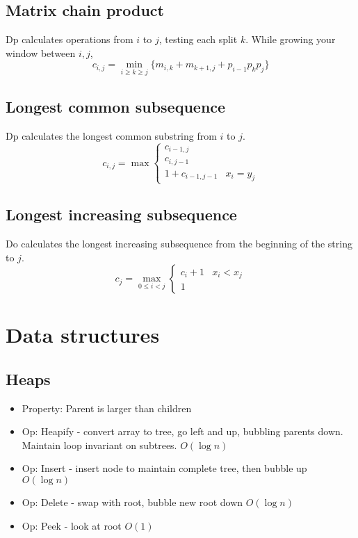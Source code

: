\subsection{Matrix chain product}
Dp calculates operations from $i$ to $j$, testing each split $k$. While growing your window between $i,j$,
$$c_{i,j} = \min_{i\geq k\geq j} \{m_{i,k} + m_{k+1,j} + p_{i-1} p_{k} p_{j}\}$$

\subsection{Longest common subsequence}
Dp calculates the longest common substring from $i$ to $j$.
$$c_{i,j} = \max\begin{cases}
c_{i-1, j}\\
c_{i, j-1}\\
1+c_{i-1, j-1} & x_i=y_j
\end{cases}$$

\subsection{Longest increasing subsequence}
Do calculates the longest increasing subsequence from the beginning of the string to $j$.
$$c_{j} = \max_{0\leq i < j}\begin{cases}
c_{i} + 1 & x_i < x_j\\
1
\end{cases}$$

\section{Data structures}
\subsection{Heaps}
\begin{itemize}
    \item Property: Parent is larger than children
    \item Op: Heapify - convert array to tree, go left and up, bubbling parents down. Maintain loop invariant on subtrees. $O(\log n)$
    \item Op: Insert - insert node to maintain complete tree, then bubble up $O(\log n)$
    \item Op: Delete - swap with root, bubble new root down $O(\log n)$
    \item Op: Peek - look at root $O(1)$
\end{itemize}

